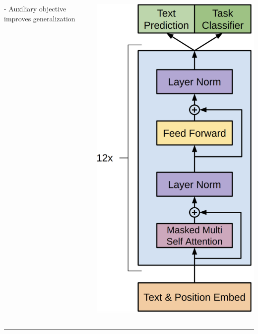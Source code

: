 \documentclass[professionalfont]{beamer}
\begin{document}
\begin{frame}
\begin{refsection}
\begin{columns}
{\begin{itemize}
            - Auxiliary objective improves generalization
\end{itemize}
}
    \includegraphics[width=1.0\linewidth]{figure/1-1.png}
\end{columns}

\vspace{0.2cm}
\hrule
\printbibliography

\end{refsection}
\end{frame}
\end{document}
